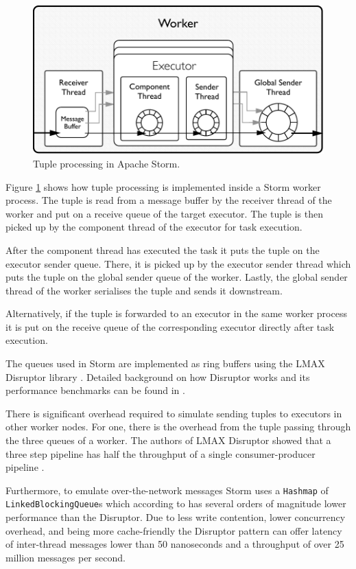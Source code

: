 \documentclass[bsc,logo,frontabs,twoside,singlespacing,normalheadings,parskip]{infthesis}\usepackage[]{graphicx}\usepackage[]{color}
\begin{document}
\begin{figure}[!htb]
	\centering
	\includegraphics[scale=0.7]{pdf/worker_inside.pdf}
	\caption{Tuple processing in Apache Storm.}
	\label{fig:worker_inside}
\end{figure}

Figure \ref{fig:worker_inside} shows how tuple processing is implemented inside a Storm worker process. The tuple is read from a message buffer by the receiver thread of the worker and put on a receive queue of the target executor. The tuple is then picked up by the component thread of the executor for task execution.

After the component thread has executed the task it puts the tuple on the executor sender queue. There, it is picked up by the executor sender thread which puts the tuple on the global sender queue of the worker. Lastly, the global sender thread of the worker serialises the tuple and sends it downstream.

Alternatively, if the tuple is forwarded to an executor in the same worker process it is put on the receive queue of the corresponding executor directly after task execution.

The queues used in Storm are implemented as ring buffers using the LMAX Disruptor library \citep{LMAXDisruptor}. Detailed background on how Disruptor works and its performance benchmarks can be found in \citep{Thompson_Farley_Barker_Gee_Stewart_2011}.

There is significant overhead required to simulate sending tuples to executors in other worker nodes. For one, there is the overhead from the tuple passing through the three queues of a worker. The authors of LMAX Disruptor showed that a three step pipeline has half the throughput of a single consumer-producer pipeline \citep{DisruptorWiki}.

Furthermore, to emulate over-the-network messages Storm uses a \texttt{Hashmap} of \texttt{LinkedBlockingQueue}s which according to \cite{Thompson_Farley_Barker_Gee_Stewart_2011} has several orders of magnitude lower performance than the Disruptor. Due to less write contention, lower concurrency overhead, and being more cache-friendly the Disruptor pattern can offer latency of inter-thread messages lower than 50 nanoseconds and a throughput of over 25 million messages per second.
\end{document}
